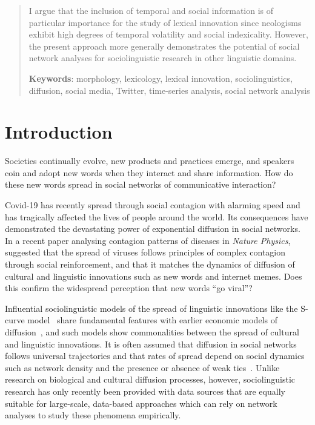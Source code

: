 \documentclass[
  a4paper,
  abstract=on,
  captions=tableabove,
  ]{scrartcl}
\begin{document}
\begin{abstract}
    I argue that the inclusion of temporal and social information is of particular importance for the study of lexical innovation since neologisms exhibit high degrees of temporal volatility and social indexicality. However, the present approach more generally demonstrates the potential of social network analyses for sociolinguistic research in other linguistic domains.  

    \vspace{2\baselineskip}

    \textbf{Keywords}: morphology, lexicology, lexical innovation, sociolinguistics, diffusion, social media, Twitter, time-series analysis, social network analysis

  \end{abstract}


\section{Introduction}
  \label{sec:intro}

  Societies continually evolve, new products and practices emerge, and speakers coin and adopt new words when they interact and share information. How do these new words spread in social networks of communicative interaction?

  Covid-19 has recently spread through social contagion with alarming speed and has tragically affected the lives of people around the world. Its consequences have demonstrated the devastating power of exponential diffusion in social networks. In a recent paper analysing contagion patterns of diseases in \emph{Nature Physics}, \textcite{Hebert-Dufresne2020MacroscopicPatterns} suggested that the spread of viruses follows principles of complex contagion through social reinforcement, and that it matches the dynamics of diffusion of cultural and linguistic innovations such as new words and internet memes. Does this confirm the widespread perception that new words \enquote{go viral}?

  Influential sociolinguistic models of the spread of linguistic innovations like the S-curve model~\parencite{Milroy1992LinguisticVariation} share fundamental features with earlier economic models of diffusion~\parencite{Rogers1962DiffusionInnovations}, and such models show commonalities between the spread of cultural and linguistic innovations. It is often assumed that diffusion in social networks follows universal trajectories and that rates of spread depend on social dynamics such as network density and the presence or absence of weak ties~\parencite{Granovetter1977StrengthWeak}. Unlike research on biological and cultural diffusion processes, however, sociolinguistic research has only recently been provided with data sources that are equally suitable for large-scale, data-based approaches which can rely on network analyses to study these phenomena empirically.
\end{document}
